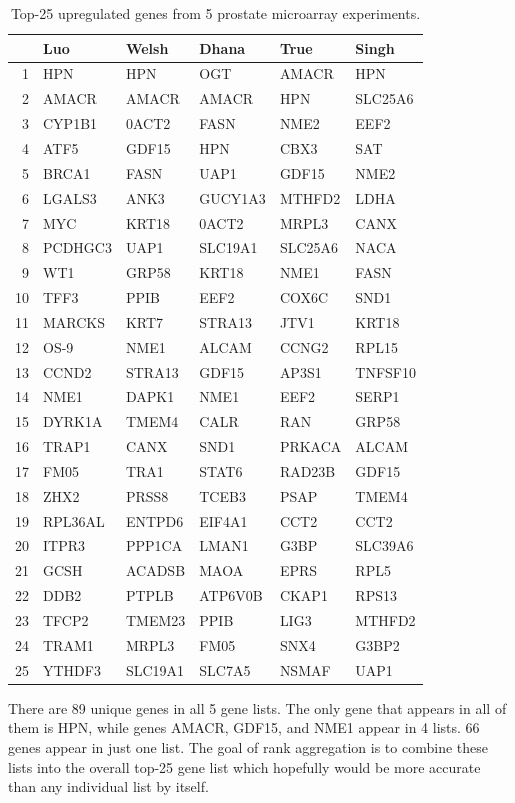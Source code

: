 \documentclass[11pt]{article}
\begin{document}
\begin{table}[ht]
\begin{center}
\begin{tabular}{rlllll}
  \hline
 & Luo & Welsh & Dhana & True & Singh \\
  \hline
1 & HPN & HPN & OGT & AMACR & HPN \\
  2 & AMACR & AMACR & AMACR & HPN & SLC25A6 \\
  3 & CYP1B1 & 0ACT2 & FASN & NME2 & EEF2 \\
  4 & ATF5 & GDF15 & HPN & CBX3 & SAT \\
  5 & BRCA1 & FASN & UAP1 & GDF15 & NME2 \\
  6 & LGALS3 & ANK3 & GUCY1A3 & MTHFD2 & LDHA \\
  7 & MYC & KRT18 & 0ACT2 & MRPL3 & CANX \\
  8 & PCDHGC3 & UAP1 & SLC19A1 & SLC25A6 & NACA \\
  9 & WT1 & GRP58 & KRT18 & NME1 & FASN \\
  10 & TFF3 & PPIB & EEF2 & COX6C & SND1 \\
  11 & MARCKS & KRT7 & STRA13 & JTV1 & KRT18 \\
  12 & OS-9 & NME1 & ALCAM & CCNG2 & RPL15 \\
  13 & CCND2 & STRA13 & GDF15 & AP3S1 & TNFSF10 \\
  14 & NME1 & DAPK1 & NME1 & EEF2 & SERP1 \\
  15 & DYRK1A & TMEM4 & CALR & RAN & GRP58 \\
  16 & TRAP1 & CANX & SND1 & PRKACA & ALCAM \\
  17 & FM05 & TRA1 & STAT6 & RAD23B & GDF15 \\
  18 & ZHX2 & PRSS8 & TCEB3 & PSAP & TMEM4 \\
  19 & RPL36AL & ENTPD6 & EIF4A1 & CCT2 & CCT2 \\
  20 & ITPR3 & PPP1CA & LMAN1 & G3BP & SLC39A6 \\
  21 & GCSH & ACADSB & MAOA & EPRS & RPL5 \\
  22 & DDB2 & PTPLB & ATP6V0B & CKAP1 & RPS13 \\
  23 & TFCP2 & TMEM23 & PPIB & LIG3 & MTHFD2 \\
  24 & TRAM1 & MRPL3 & FM05 & SNX4 & G3BP2 \\
  25 & YTHDF3 & SLC19A1 & SLC7A5 & NSMAF & UAP1 \\
   \hline
\end{tabular}
\caption{Top-25 upregulated genes from 5 prostate microarray experiments.}
\end{center}
\end{table}
There are 89 unique genes in all 5 gene lists. The only gene that appears in all of them is HPN, while
genes AMACR, GDF15, and NME1 appear in 4 lists. 66 genes appear in just one list. The goal 
of rank aggregation is to combine these lists into the overall top-25 gene list which hopefully
would be more accurate than any individual list by itself. 
\end{document}
